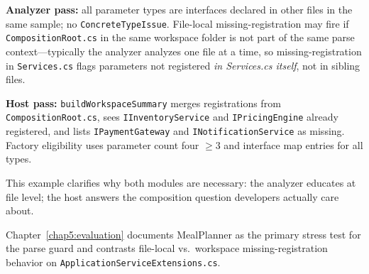 \textbf{Analyzer pass:} all parameter types are interfaces declared in other files in the same sample; no \texttt{ConcreteTypeIssue}. File-local missing-registration may fire if \texttt{CompositionRoot.cs} in the same workspace folder is not part of the same parse context---typically the analyzer analyzes one file at a time, so missing-registration in \texttt{Services.cs} flags parameters not registered \emph{in Services.cs itself}, not in sibling files.

\textbf{Host pass:} \texttt{buildWorkspaceSummary} merges registrations from \texttt{CompositionRoot.cs}, sees \texttt{IInventoryService} and \texttt{IPricingEngine} already registered, and lists \texttt{IPaymentGateway} and \texttt{INotificationService} as missing. Factory eligibility uses parameter count four $\geq 3$ and interface map entries for all types.

This example clarifies why both modules are necessary: the analyzer educates at file level; the host answers the composition question developers actually care about.

Chapter~\ref{chap5:evaluation} documents MealPlanner as the primary stress test for the parse guard and contrasts file-local vs.\ workspace missing-registration behavior on \texttt{ApplicationServiceExtensions.cs}.
